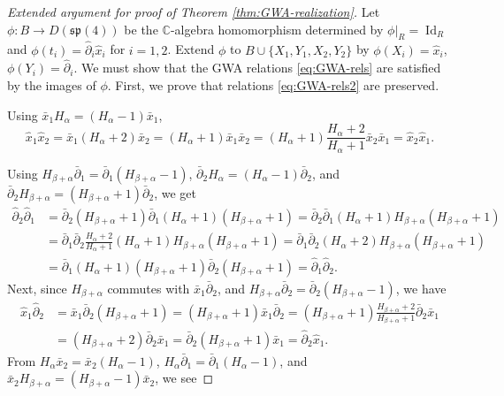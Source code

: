 \documentclass[10pt,a4paper]{amsart}
\numberwithin{equation}{section}
\DeclareMathOperator{\Id}{Id}
\begin{document}
\begin{proof}[Extended argument for proof of Theorem \ref{thm:GWA-realization}]
	Let $\phi\colon B\to D(\mathfrak{sp}(4))$ be the $\mathbb{C}$-algebra homomorphism determined by $\phi|_R=\Id_R$ and $\phi(t_i)=\hat\partial_i\hat x_i$ for $i=1,2$. Extend $\phi$ to $B\cup\{X_1,Y_1,X_2,Y_2\}$ by $\phi(X_i)=\hat x_i$, $\phi(Y_i)=\hat\partial_i$. We must show that the GWA relations \eqref{eq:GWA-rels} are satisfied by the images of $\phi$.
	First, we prove that relations \eqref{eq:GWA-rels2} are preserved.
	
	Using $\bar{x}_1 H_\alpha = (H_\alpha-1)\bar{x}_1$,
	\[
	\hat{x}_1\hat{x}_2 = \bar{x}_1(H_\alpha+2)\bar{x}_2 = (H_\alpha+1)\bar{x}_1\bar{x}_2=(H_\alpha+1)\frac{H_\alpha+2}{H_\alpha+1}\bar{x}_2\bar{x}_1=\hat{x}_2\hat{x}_1.
	\]
	
	Using $H_{\beta+\alpha}\bar{\partial}_1=\bar{\partial}_1(H_{\beta+\alpha}-1)$, $\bar{\partial}_2 H_\alpha=(H_\alpha-1)\bar{\partial}_2$, and $\bar{\partial}_2 H_{\beta+\alpha} = (H_{\beta+\alpha}+1)\bar{\partial}_2$, we get
	\begin{align*}
		\hat{\partial}_2\hat{\partial}_1 &= \bar{\partial}_2(H_{\beta+\alpha}+1)\bar{\partial}_1(H_\alpha+1)(H_{\beta+\alpha}+1)=\bar{\partial}_2\bar{\partial}_1(H_\alpha+1)H_{\beta+\alpha}(H_{\beta+\alpha}+1)\\
		&=\bar{\partial}_1\bar{\partial}_2\frac{H_\alpha+2}{H_\alpha+1}(H_\alpha+1)H_{\beta+\alpha}(H_{\beta+\alpha}+1)=
		\bar{\partial}_1\bar{\partial}_2(H_\alpha+2)H_{\beta+\alpha}(H_{\beta+\alpha}+1)\\
		&=\bar{\partial}_1 (H_\alpha+1)(H_{\beta+\alpha}+1)\bar{\partial}_2(H_{\beta+\alpha}+1)=\hat{\partial}_1\hat{\partial}_2.
	\end{align*}
	Next, since $H_{\beta+\alpha}$ commutes with $\bar{x}_1\bar{\partial}_2$, and $H_{\beta+\alpha}\bar{\partial}_2=\bar{\partial}_2(H_{\beta+\alpha}-1)$, we have
	\begin{align*}
		\hat{x}_1\hat{\partial}_2 &= \bar{x}_1\bar{\partial}_2(H_{\beta+\alpha}+1)=
		(H_{\beta+\alpha}+1)\bar{x}_1\bar{\partial}_2=
		(H_{\beta+\alpha}+1)\frac{H_{\beta+\alpha}+2}{H_{\beta+\alpha}+1}\bar{\partial}_2\bar{x}_1\\
		&=(H_{\beta+\alpha}+2)\bar{\partial}_2\bar{x}_1=\bar{\partial}_2(H_{\beta+\alpha}+1)\bar{x}_1=\hat{\partial}_2\hat{x}_1.
	\end{align*}
	From $H_\alpha\bar{x}_2=\bar{x}_2(H_\alpha-1)$, $H_\alpha\bar{\partial}_1=\bar{\partial}_1(H_\alpha-1)$, and $\bar{x}_2 H_{\beta+\alpha} = (H_{\beta+\alpha}-1)\bar{x}_2$, we see

\end{proof}
\end{document}
